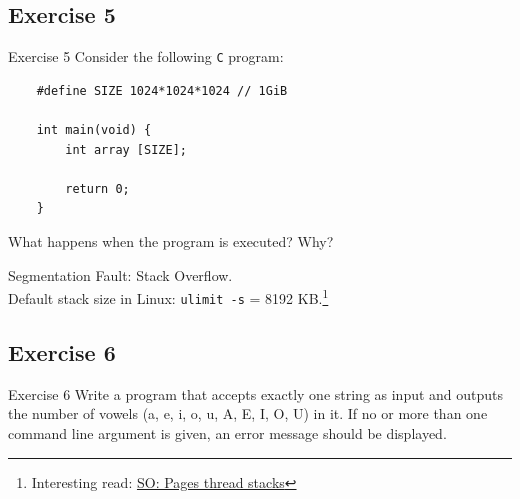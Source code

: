 \documentclass[10pt]{beamer}
\begin{document}
\subsection*{Exercise 5}
\frame{\subsectionpage}
\begin{frame}{Exercise 5}
	Consider the following \texttt{C} program:
	\begin{verbatim}
    #define SIZE 1024*1024*1024 // 1GiB

    int main(void) {
        int array [SIZE];       

        return 0;
    }
	\end{verbatim}
	What happens when the program is executed? Why? 
	\begin{center}
	 \alert{Segmentation Fault: Stack Overflow. \\
	 Default stack size in Linux: \texttt{ulimit -s} = 8192 KB.\footnote{Interesting read: \href{https://unix.stackexchange.com/questions/127602/default-stack-size-for-pthreads}{SO: Pages thread stacks}} \\}
	\end{center}
	\end{frame}

\subsection*{Exercise 6}
\frame{\subsectionpage}
\begin{frame}{Exercise 6}
Write a program that accepts exactly one string as input and outputs the number of vowels (a, e, i, o, u, A, E, I, O, U) in it.
	If no or more than one command line argument is given, an error message should be displayed. \\
    \end{frame}
    \begin{frame}
    \end{frame}

    
\end{document}
